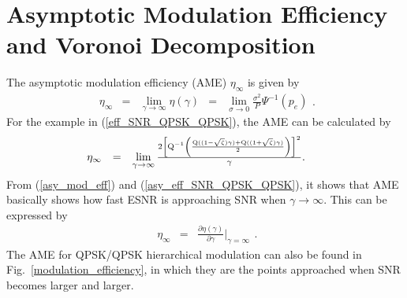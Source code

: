 \documentclass[10pt,fleqn, twocolumn]{IEEEtran}
\begin{document}
\section{Asymptotic Modulation Efficiency and Voronoi Decomposition}
The asymptotic modulation efficiency (AME) $\eta_{\infty}$ is
given by
\begin{equation}
\begin{array}{rcccl}
\eta_{\infty}&=&\lim\limits_{\gamma\rightarrow\infty}\eta\left(\gamma\right)&=&\lim\limits_{\sigma\rightarrow0}\frac{\sigma^2}{P}\Psi^{-1}\left(p_{e}\right)
\end{array}.\label{asy_mod_eff}
\end{equation}
\noindent For the example in (\ref{eff_SNR_QPSK_QPSK}), the AME
can be calculated by
\begin{equation}\hspace{-0.225in}
\begin{array}{rcl}
\eta_{\infty}&=&\lim\limits_{\gamma\rightarrow\infty}\frac{2\left[{\rm
Q}^{-1}\left(\frac{{\rm Q}((1-\sqrt{\zeta})\gamma)+{\rm
Q}((1+\sqrt{\zeta})\gamma)}{2}\right)\right]^2}{\gamma}.
\end{array}\label{asy_eff_SNR_QPSK_QPSK}
\end{equation}
\noindent From (\ref{asy_mod_eff}) and
(\ref{asy_eff_SNR_QPSK_QPSK}), it shows that AME basically shows
how fast ESNR is approaching SNR when $\gamma\rightarrow\infty$.
This can be expressed by
\begin{equation}
\begin{array}{rcl}
\eta_{\infty}&=&\frac{\partial\eta\left(\gamma\right)}{\partial\gamma}|_{\gamma=\infty}
\end{array}.\label{asy_mod_eff2}
\end{equation}
\noindent The AME for QPSK/QPSK hierarchical modulation can also
be found in Fig.~\ref{modulation_efficiency}, in which they are
the points approached when SNR becomes larger and larger.
\end{document}
